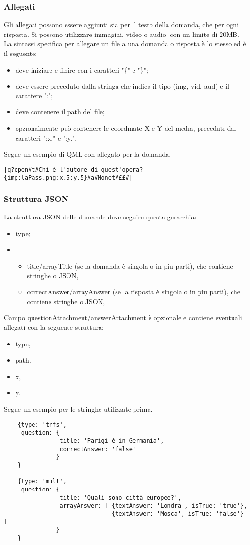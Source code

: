 \documentclass[a4paper, titlepage]{article}
\begin{document}
	\subsubsection{Allegati}
	Gli allegati possono essere aggiunti sia per il testo della domanda, che per ogni risposta.
	Si possono utilizzare immagini, video o audio, con un limite di 20MB.
	La sintassi specifica per allegare un file a una domanda o risposta è lo stesso ed è il seguente:
	\begin{itemize}
		\item deve iniziare e finire con i caratteri "\{" e "\}";
		\item deve essere preceduto dalla stringa che indica il tipo (img, vid, aud) e il carattere ":";
		\item deve contenere il path del file;
		\item opzionalmente può contenere le coordinate X e Y del media, preceduti dai caratteri ":x." e ":y.".
	\end{itemize}
	Segue un esempio di QML con allegato per la domanda.
	\begin{verbatim}|q?open#t#Chi è l'autore di quest'opera?{img:laPass.png:x.5:y.5}#a#Monet#££#|\end{verbatim}
	
	\subsubsection{Struttura JSON}
	\label{qson}
	La struttura JSON delle domande deve seguire questa gerarchia:
	\begin{itemize}
		\item type;
		\item \begin{itemize}
			\item title/arrayTitle (se la domanda è singola o in piu parti), che contiene stringhe o JSON,
			\item correctAnswer/arrayAnswer (se la risposta è singola o in piu parti), che contiene stringhe o JSON,
		\end{itemize}
	\end{itemize}
	Campo questionAttachment/answerAttachment è opzionale e contiene eventuali allegati con la seguente struttura:
	\begin{itemize}
		\item type,
		\item path,
		\item x,
		\item y.
	\end{itemize}
	Segue un esempio per le stringhe utilizzate prima.
	\begin{verbatim}
	{type: 'trfs',
	 question: {
	            title: 'Parigi è in Germania',
	            correctAnswer: 'false'
	           }	
	}
	
	{type: 'mult',
	 question: {
	            title: 'Quali sono città europee?',
	            arrayAnswer: [ {textAnswer: 'Londra', isTrue: 'true'},
	                           {textAnswer: 'Mosca', isTrue: 'false'} ]
	           }	
	}
	\end{verbatim}
	
\end{document}
